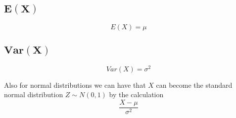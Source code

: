 \documentclass[12pt]{article}
\begin{document}
\subsection{$\bm{E(X)}$}

\begin{equation*}
  E(X) = \mu
\end{equation*}

\subsection{$\bm{Var(X)}$}

\begin{equation*}
  Var(X)= \sigma^{2}
\end{equation*}

Also for normal distributions we can have that $X$ can become the standard normal distribution $Z \sim N(0,1)$ by the calculation
\begin{equation*}
  \frac{X-\mu}{\sigma^{2}}
\end{equation*}
\end{document}
